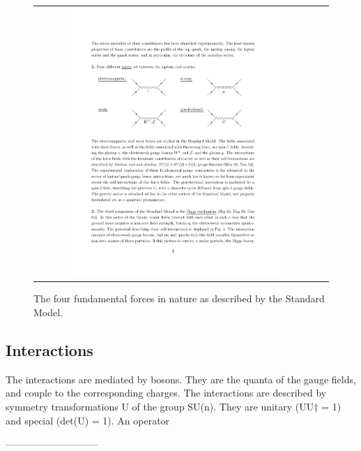 	\begin{figure}[tbh!]
		\centering
		\begin{tabular}{cc}
			\includegraphics[width=0.75\textwidth]{theory/pics/SM_forces.pdf}
		\end{tabular}
		\caption{The four fundamental forces in nature as described by the Standard Model.}
		\label{fig:SM_forces}
	\end{figure}

\subsection{Interactions}

The interactions are mediated by bosons. They are the quanta of the gauge fields, and couple to the corresponding charges. The interactions are described by symmetry transformations U of the group SU(n). They are unitary (UU† = 1) and special (det(U) = 1). An operator


-----------------------------
	
